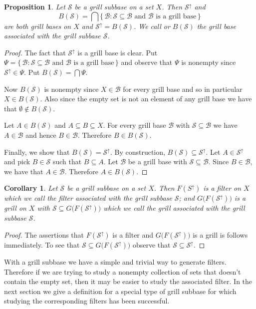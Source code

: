 \documentclass[12pt]{article}
\theoremstyle{plain}
\newtheorem{prop}[thm]{Proposition}
\newtheorem{cor}[thm]{Corollary}
\theoremstyle{definition}
\newcommand{\calB}{\mathcal{B}}
\newcommand{\calS}{\mathcal{S}}
\begin{document}
\begin{prop}
  \label{prop:GrillSb}
  Let $\calS$ be a grill subbase on a set $X$.
  Then $\calS^\uparrow$ and
  \[
    B(\calS) = \bigcap\{\, \calB : \mbox{$\calS \subseteq \calB$ and $\calB$ is a grill base} \,\}
  \]
  are both grill bases on $X$ and $\calS^\uparrow = B(\calS)$.
  We call or $B(\calS)$ the \textsl{grill base associated with the grill subbase $\calS$}.
\end{prop}
\begin{proof}
  The fact that $\calS^\uparrow$ is a grill base is clear.
  Put $\Psi = \{\, \calB : \mbox{$\calS \subseteq \calB$ and $\calB$ is a grill base} \,\}$ and observe that $\Psi$ is nonempty since $\calS^\uparrow \in \Psi$. 
  Put $B(\calS) = \bigcap\Psi$.

  Now $B(\calS)$ is nonempty since $X \in \calB$ for every grill base and so in particular $X \in B(\calS)$.
  Also since the empty set is not an element of any grill base we have that $\emptyset \not\in B(\calS)$.

  Let $A \in B(\calS)$ and $A \subseteq B \subseteq X$. 
  For every grill base $\calB$ with $\calS \subseteq \calB$ we have $A \in \calB$ and hence $B \in \calB$.
  Therefore $B \in B(\calS)$.

  Finally, we show that $B(\calS) = \calS^\uparrow$.
  By construction, $B(\calS) \subseteq \calS^\uparrow$.
  Let $A \in \calS^\uparrow$ and pick $B \in \calS$ such that $B \subseteq A$. 
  Let $\calB$ be a grill base with $\calS \subseteq \calB$.
  Since $B \in \calB$, we have that $A \in \calB$.
  Therefore $A \in B(\calS)$.
\end{proof}

\begin{cor}
  Let $\calS$ be a grill subbase on a set $X$.
  Then $F(S^\uparrow)$ is a filter on $X$ which we call the \textsl{filter associated with the grill subbase $\calS$}; and $G\bigl(F(\calS^\uparrow)\bigr)$ is a grill on $X$ with $\calS \subseteq G\bigl(F(\calS^\uparrow)\bigr)$ which we call the \textsl{grill associated with the grill subbase $\calS$}. 
\end{cor}
\begin{proof}
  The assertions that $F(\calS^\uparrow)$ is a filter and $G\bigl(F(\calS^\uparrow)\bigr)$ is a grill is follows immediately.
  To see that $\calS \subseteq G\bigl(F(\calS^\uparrow)\bigr)$ observe that $\calS \subseteq \calS^\uparrow$.
\end{proof}

With a grill subbase we have a simple and trivial way to generate filters.
Therefore if we are trying to study a nonempty collection of sets that doesn't contain the empty set, then it may be easier to study the associated filter.
In the next section we give a definition for a special type of grill subbase for which studying the corresponding filters has been successful.
\end{document}
